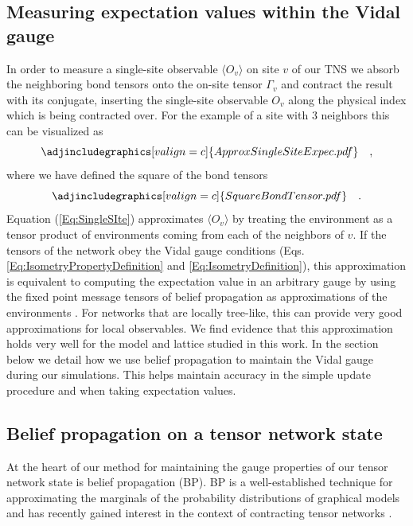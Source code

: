 \documentclass[%
 superscriptaddress,
 amsmath,amssymb,
 prx, nofootinbib,
 twocolumn
]{revtex4-2}
\begin{document}
\subsection*{Measuring expectation values within the Vidal gauge}
In order to measure a single-site observable $\langle O_{v} \rangle$ on site $v$ of our TNS we absorb the neighboring bond tensors onto the on-site tensor $\Gamma_{v}$ and contract the result with its conjugate, inserting the single-site observable $O_{v}$ along the physical index which is being contracted over.
For the example of a site with $3$ neighbors this can be visualized as
\begin{equation}
    \adjincludegraphics[valign=c]{ApproxSingleSiteExpec.pdf} \quad,
    \label{Eq:SingleSIte}
\end{equation}
where we have defined the square of the bond tensors
\begin{equation}
    \adjincludegraphics[valign=c]{SquareBondTensor.pdf} \quad.
    \label{Eq:SquareBondTensors}
\end{equation}
Equation (\ref{Eq:SingleSIte}) approximates $\langle O_{v} \rangle$ by treating the environment as a tensor product of environments coming from each of the neighbors of $v$. If the tensors of the network obey the Vidal gauge conditions (Eqs. \ref{Eq:IsometryPropertyDefinition} and \ref{Eq:IsometryDefinition}), this approximation is equivalent to computing the expectation value in an arbitrary gauge by using the fixed point message tensors of belief propagation as approximations of the environments \cite{Alkabetz2021, TindallGauging2023}. For networks that are locally tree-like, this can provide very good approximations for local observables. We find evidence that this approximation holds very well for the model and lattice studied in this work.
In the section below we detail how we use belief propagation to maintain the Vidal gauge during our simulations. This helps maintain accuracy in the simple update procedure and when taking expectation values. 


\subsection*{Belief propagation on a tensor network state}
At the heart of our method for maintaining the gauge properties of our tensor network state is belief propagation (BP). BP is a well-established technique for approximating the marginals of the probability distributions of graphical models \cite{BeliefPropagation1} and has recently gained interest in the context of contracting tensor networks \cite{TensorNetworkBeliefPropagation1,TensorNetworkBeliefPropagation2,TensorNetworkBeliefPropagation3,SimpleUpdateGauging3}. 
\end{document}
